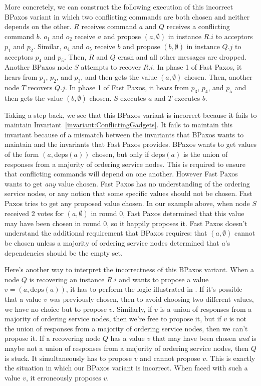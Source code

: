 \documentclass{mwhittaker}
\theoremstyle{definition}
\newcommand{\deps}[1]{\text{deps}(#1)}
\newcommand{\invref}[1]{Invariant~\ref{invariant:#1}}
\begin{document}
More concretely, we can construct the following execution of this incorrect
BPaxos variant in which two conflicting commands are both chosen and neither
depends on the other. $R$ receives command $a$ and $Q$ receives a conflicting
command $b$.  $o_1$ and $o_2$ receive $a$ and propose $(a, \emptyset)$ in
instance $R.i$ to acceptors $p_1$ and $p_2$. Similar, $o_4$ and $o_5$ receive
$b$ and propose $(b, \emptyset)$ in instance $Q.j$ to acceptors $p_4$ and
$p_5$. Then, $R$ and $Q$ crash and all other messages are dropped. Another
BPaxos node $S$ attempts to recover $R.i$. In phase 1 of Fast Paxos, it hears
from $p_1$, $p_2$, and $p_3$, and then gets the value $(a, \emptyset)$ chosen.
Then, another node $T$ recovers $Q.j$. In phase 1 of Fast Paxos, it hears from
$p_3$, $p_4$, and $p_5$ and then gets the value $(b, \emptyset)$ chosen. $S$
executes $a$ and $T$ executes $b$.

Taking a step back, we see that this BPaxos variant is incorrect because it
fails to maintain \invref{ConflictingGadgets}. It fails to maintain this
invariant because of a mismatch between the invariants that BPaxos wants to
maintain and the invariants that Fast Paxos provides. BPaxos wants to get
values of the form $(a, \deps{a})$ chosen, but only if $\deps{a}$ is the union
of responses from a majority of ordering service nodes. This is required to
ensure that conflicting commands will depend on one another. However Fast
Paxos wants to get \emph{any} value chosen. Fast Paxos has no understanding of
the ordering service nodes, or any notion that some specific values should not
be chosen. Fast Paxos tries to get any proposed value chosen. In our example
above, when node $S$ received 2 votes for $(a, \emptyset)$ in round 0, Fast
Paxos determined that this value may have been chosen in round 0, so it happily
proposes it. Fast Paxos doesn't understand the additional requirement that
BPaxos requires: that $(a, \emptyset)$ cannot be chosen unless a majority of
ordering service nodes determined that $a$'s dependencies should be the empty
set.

Here's another way to interpret the incorrectness of this BPaxos variant. When
a node $Q$ is recovering an instance $R.i$ and wants to propose a value $v =
(a, \deps{a})$, it has to perform the logic illustrated in
.
%
If it's possible that a value $v$ was previously chosen, then to avoid choosing
two different values, we have no choice but to propose $v$.
%
Similarly, if $v$ is a union of responses from a majority of ordering service
nodes, then we're free to propose it, but if $v$ is not the union of responses
from a majority of ordering service nodes, then we can't propose it.
%
If a recovering node $Q$ has a value $v$ that may have been chosen \emph{and}
is maybe not a union of responses from a majority of ordering service nodes,
then $Q$ is stuck. It simultaneously has to propose $v$ and cannot propose $v$.
This is exactly the situation in which our BPaxos variant is incorrect. When
faced with such a value $v$, it erroneously proposes $v$.
\end{document}
